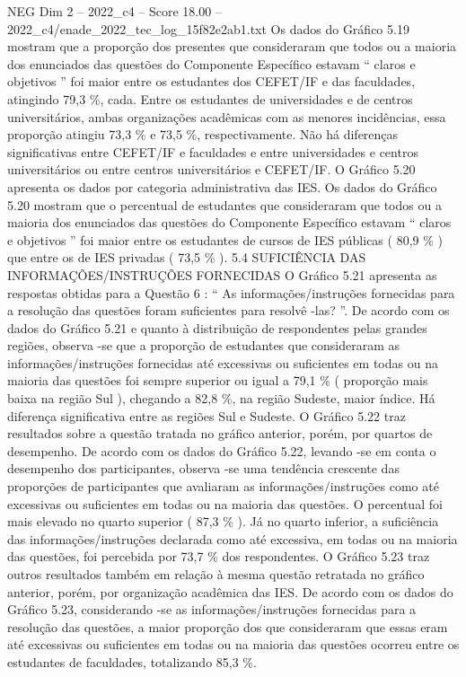 \begin{textsample}{NEG Dim 2 – 2022\_c4 – Score 18.00 – 2022\_c4/enade\_2022\_tec\_log\_15f82e2ab1.txt}
Os dados do Gráfico 5.19 mostram que a proporção dos presentes que consideraram que todos ou a maioria dos enunciados das questões do Componente Específico estavam “ claros e objetivos ” foi maior entre os estudantes dos CEFET/IF e das faculdades, atingindo 79,3 \%, cada.
Entre os estudantes de universidades e de centros universitários, ambas organizações acadêmicas com as menores incidências, essa proporção atingiu 73,3 \% e 73,5 \%, respectivamente.
Não há diferenças significativas entre CEFET/IF e faculdades e entre universidades e centros universitários ou entre centros universitários e CEFET/IF.
O Gráfico 5.20 apresenta os dados por categoria administrativa das IES.
Os dados do Gráfico 5.20 mostram que o percentual de estudantes que consideraram que todos ou a maioria dos enunciados das questões do Componente Específico estavam “ claros e objetivos ” foi maior entre os estudantes de cursos de IES públicas ( 80,9 \% ) que entre os de IES privadas ( 73,5 \% ). 5.4 SUFICIÊNCIA DAS INFORMAÇÕES/INSTRUÇÕES FORNECIDAS O Gráfico 5.21 apresenta as respostas obtidas para a Questão 6 : “ As informações/instruções fornecidas para a resolução das questões foram suficientes para resolvê -las? ”.
De acordo com os dados do Gráfico 5.21 e quanto à distribuição de respondentes pelas grandes regiões, observa -se que a proporção de estudantes que consideraram as informações/instruções fornecidas até excessivas ou suficientes em todas ou na maioria das questões foi sempre superior ou igual a 79,1 \% ( proporção mais baixa na região Sul ), chegando a 82,8 \%, na região Sudeste, maior índice.
Há diferença significativa entre as regiões Sul e Sudeste.
O Gráfico 5.22 traz resultados sobre a questão tratada no gráfico anterior, porém, por quartos de desempenho.
De acordo com os dados do Gráfico 5.22, levando -se em conta o desempenho dos participantes, observa -se uma tendência crescente das proporções de participantes que avaliaram as informações/instruções como até excessivas ou suficientes em todas ou na maioria das questões.
O percentual foi mais elevado no quarto superior ( 87,3 \% ).
Já no quarto inferior, a suficiência das informações/instruções declarada como até excessiva, em todas ou na maioria das questões, foi percebida por 73,7 \% dos respondentes.
O Gráfico 5.23 traz outros resultados também em relação à mesma questão retratada no gráfico anterior, porém, por organização acadêmica das IES.
De acordo com os dados do Gráfico 5.23, considerando -se as informações/instruções fornecidas para a resolução das questões, a maior proporção dos que consideraram que essas eram até excessivas ou suficientes em todas ou na maioria das questões ocorreu entre os estudantes de faculdades, totalizando 85,3 \%.

\end{textsample}
